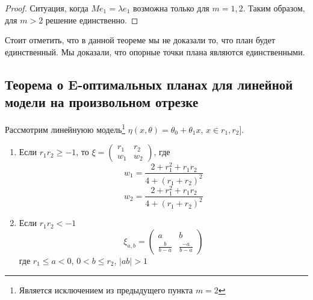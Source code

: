 \begin{proof}
Ситуация, когда $Me_1 = \lambda e_1$ возможна только для $m=1,2$. Таким образом, для $m > 2$ решение единственно. 
\end{proof}


  \begin{note}
  Стоит отметить, что в данной теореме мы не доказали то, что план будет единственный. Мы доказали, что опорные точки плана являются единственными. 
 \end{note}

\subsection{Теорема о E-оптимальных планах для линейной модели на произвольном отрезке}
Рассмотрим линейнуюю модель\footnote{Является исключением из предыдущего пункта $m=2$} $\eta(x, \theta) = \theta_0 + \theta_1 x$, $x \in r_1,r_2]$. 
\begin{thm}
\begin{enumerate}
\item Если $r_1r_2 \geq -1$, то $\xi = \begin{pmatrix} r_1 & r_2 \\ w_1 & w_2\end{pmatrix}$, где 
$$w_1 = \frac{2+r_1^2 + r_1r_2}{4+(r_1+r_2)^2}$$
$$ w_2 = \frac{2+r_1^2 + r_1r_2}{4+(r_1+r_2)^2}$$ 
\item Если $r_1r_2 < -1$
$$\xi_{a,b} = \begin{pmatrix} a & b \\ \frac{b}{b-a} & \frac{-a}{b-a} \end{pmatrix}$$
где $r_1 \leq a < 0$, $0 < b \leq r_2$, $|ab|> 1$
\end{enumerate}
\end{thm}
